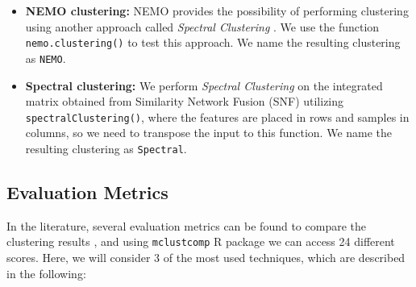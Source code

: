 \begin{itemize}[]
    \item \textbf{NEMO clustering:} NEMO provides the possibility of performing clustering using another approach called \textit{Spectral Clustering} \cite{von2007SP}. We use the function \verb|nemo.clustering()| to test this approach. We name the resulting clustering as \verb|NEMO|.
    
    \item \textbf{Spectral clustering:} We perform \textit{Spectral Clustering} on the integrated matrix obtained from Similarity Network Fusion (SNF) utilizing \verb|spectralClustering()|, where the features are placed in rows and samples in columns, so we need to transpose the input to this function. We name the resulting clustering as \verb|Spectral|.
\end{itemize}


\subsection{Evaluation Metrics}

In the literature, several evaluation metrics can be found to compare the clustering results \cite{wagner2007comparing}, and using \verb|mclustcomp| R package we can access 24 different scores. Here, we will consider 3 of the most used techniques, which are described in the following:

